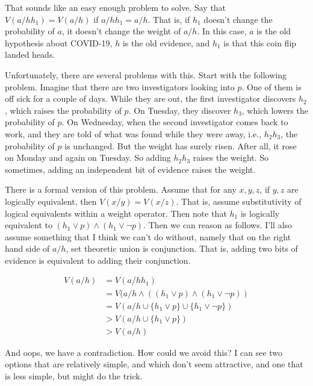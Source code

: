 \documentclass[
  11pt,
  letterpaper,
  DIV=11,
  numbers=noendperiod,
  oneside]{scrartcl}
\begin{document}
That sounds like an easy enough problem to solve. Say that
\(V(a/hh_1) = V(a/h)\) if \(a/hh_1 = a/h\). That is, if \(h_1\) doesn't
change the probability of \(a\), it doesn't change the weight of
\(a/h\). In this case, \(a\) is the old hypothesis about COVID-19, \(h\)
is the old evidence, and \(h_1\) is that this coin flip landed heads.

Unfortunately, there are several problems with this. Start with the
following problem. Imagine that there are two investigators looking into
\(p\). One of them is off sick for a couple of days. While they are out,
the first investigator discovers \(h_2\), which raises the probability
of \(p\). On Tuesday, they discover \(h_3\), which lowers the
probability of \(p\). On Wednesday, when the second investigator comes
back to work, and they are told of what was found while they were away,
i.e., \(h_2h_3\), the probability of \(p\) is unchanged. But the weight
has surely risen. After all, it rose on Monday and again on Tuesday. So
adding \(h_2h_3\) raises the weight. So sometimes, adding an independent
bit of evidence raises the weight.

There is a formal version of this problem. Assume that for any
\(x, y, z\), if \(y, z\) are logically equivalent, then
\(V(x/y) = V(x/z)\). That is, assume substitutivity of logical
equivalents within a weight operator. Then note that \(h_1\) is
logically equivalent to \((h_1 \vee p) \wedge (h_1 \vee \neg p)\). Then
we can reason as follows. I'll also assume something that I think we
can't do without, namely that on the right hand side of \(a/h\), set
theoretic union is conjunction. That is, adding two bits of evidence is
equivalent to adding their conjunction.

\begin{align*}
V(a/h) &= V(a/hh_1) \\
   &= V(a/h \wedge ((h_1 \vee p) \wedge (h_1 \vee \neg p)) \\
   &= V(a/h \cup \{h_1 \vee p\} \cup \{h_1 \vee \neg p\}) \\
   &> V(a/h \cup \{h_1 \vee p\}) \\
   &> V(a/h)
\end{align*}

And oops, we have a contradiction. How could we avoid this? I can see
two options that are relatively simple, and which don't seem attractive,
and one that is less simple, but might do the trick.
\end{document}
